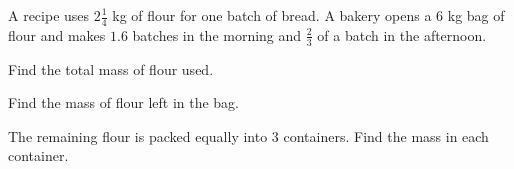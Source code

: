 A recipe uses $2\frac{1}{4}$ kg of flour for one batch of bread. A bakery opens a $6$ kg bag of flour and makes $1.6$ batches in the morning and $\frac{2}{3}$ of a batch in the afternoon.
\begin{subparts}
  \item Find the total mass of flour used.
  \item Find the mass of flour left in the bag.
  \item The remaining flour is packed equally into $3$ containers. Find the mass in each container.
\end{subparts}
